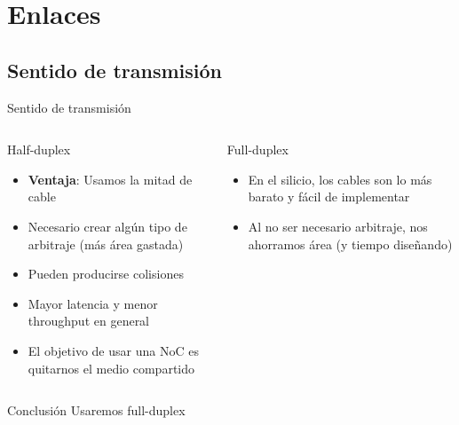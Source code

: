 \section{Enlaces}

\subsection{Sentido de transmisión}
\begin{frame}{Sentido de transmisión}
    \begin{columns}
        \begin{column}{.5\textwidth}
            \begin{alertblock}{Half-duplex}
                \begin{itemize}
                    \item \textbf{Ventaja}: Usamos la mitad de cable
                    \item Necesario crear algún tipo de arbitraje (más área gastada)
                    \item Pueden producirse colisiones
                    \item Mayor latencia y menor throughput en general
                    \item El objetivo de usar una NoC es quitarnos el medio compartido
                \end{itemize}
            \end{alertblock}
        \end{column} %
        \begin{column}{.5\textwidth}
            \begin{block}{Full-duplex}
                \begin{itemize}
                    \item En el silicio, los cables son lo más barato y fácil de implementar
                    \item Al no ser necesario arbitraje, nos ahorramos área (y tiempo diseñando)
                \end{itemize}
            \end{block}
        \end{column} %
    \end{columns}
    
    \begin{exampleblock}{Conclusión}
        Usaremos full-duplex
    \end{exampleblock}
\end{frame}

